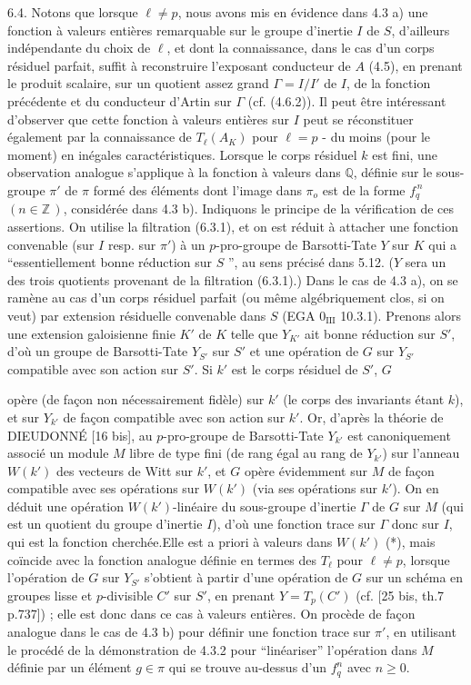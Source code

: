 6.4. Notons que lorsque $\ell \neq p$, nous avons mis en évidence dans 4.3 a) une fonction à valeurs entières remarquable sur le groupe d'inertie $I$ de $S$, d'ailleurs indépendante du choix de $\ell$, et dont la connaissance, dans le cas d'un corps résiduel parfait, suffit à reconstruire l'exposant conducteur de $A$ (4.5), en prenant le produit scalaire, sur un quotient assez grand $\Gamma = I/I'$ de $I$, de la fonction précédente et du conducteur d'Artin sur $\Gamma$ (cf. (4.6.2)). Il peut être intéressant d'observer que cette fonction à valeurs entières sur $I$ peut se réconstituer également par la connaissance de $T_\ell(A_K)$ pour $\ell = p$ - du moins (pour le moment) en inégales caractéristiques. Lorsque le corps résiduel $k$ est fini, une observation analogue s'applique à la fonction à valeurs dans $\mathbb{Q}$, définie sur le sous-groupe $\pi'$ de $\pi$ formé des éléments dont l'image dans $\pi_o$ est de la forme $f_q^{\,n}$ $(n \in \mathbb{Z}\,)$, considérée dans 4.3 b). Indiquons le principe de la vérification de ces assertions. On utilise la filtration (6.3.1), et on est réduit à attacher une fonction convenable (sur $I$ resp. sur $\pi'$) à un $p$-pro-groupe de Barsotti-Tate $Y$ sur $K$ qui a ``essentiellement bonne réduction sur $S$ '', au sens précisé dans 5.12. ($Y$ sera un des trois quotients provenant de la filtration (6.3.1).) Dans le cas de 4.3 a), on se ramène au cas d'un corps résiduel parfait (ou même algébriquement clos, si on veut) par extension résiduelle convenable dans $S$ (EGA $0_{\mathrm{III}}$ 10.3.1). Prenons alors une extension galoisienne finie $K'$ de $K$ telle que $Y_{K'}$ ait bonne réduction sur $S'$, d'où un groupe de Barsotti-Tate $Y_{S'}$ sur $S'$ et une opération de $G$ sur $Y_{S'}$ compatible avec son action sur $S'$. Si $k'$ est le corps résiduel de $S'$, $G$



opère (de façon non nécessairement fidèle) sur $k'$ (le corps des invariants étant $k$), et sur $Y_{k'}$ de façon compatible avec son action sur $k'$. Or, d'après la théorie de DIEUDONNÉ [16 bis], au $p$-pro-groupe de Barsotti-Tate $Y_{k'}$ est canoniquement associé  un module $M$ libre de type fini (de rang égal au rang de $Y_{k'}$) sur l'anneau $W(k')$ des vecteurs de Witt sur $k'$, et $G$ opère évidemment sur $M$ de façon compatible avec ses opérations sur $W(k')$ (via ses opérations sur $k'$). On en déduit une opération $W(k')$-linéaire du sous-groupe d'inertie $\Gamma$ de $G$ sur $M$ (qui est un quotient du groupe d'inertie $I$), d'où une fonction trace sur $\Gamma$ donc sur $I$, qui est la fonction cherchée.Elle est a priori à valeurs dans $W(k')$ (*), mais coïncide avec la fonction analogue définie en termes des $T_\ell$ pour $\ell \neq p$, lorsque l'opération de $G$ sur $Y_{S'}$ s'obtient à partir d'une opération de $G$ sur un schéma en groupes lisse et $p$-divisible $C'$ sur $S'$, en prenant $Y = T_p(C')$ (cf. [25 bis, th.7 p.737]) ; elle est donc dans ce cas à valeurs entières. On procède de façon analogue dans le cas de 4.3 b) pour définir une fonction trace sur $\pi'$, en utilisant le procédé de la démonstration de 4.3.2 pour ``linéariser'' l'opération dans $M$ définie par un élément $g \in \pi$ qui se trouve au-dessus d'un $f_q^n$ avec $n \geqslant 0$.


